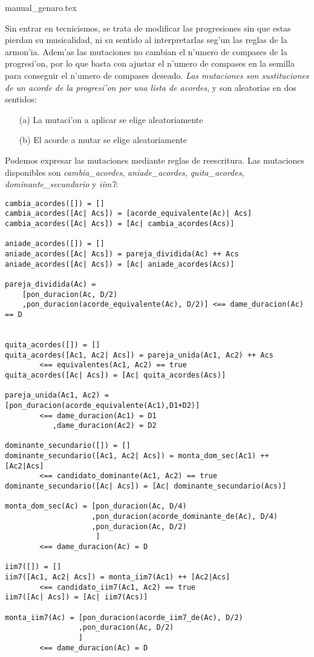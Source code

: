 ﻿manual_genaro.tex\documentclass[a4paper,12pt]{article}
\begin{document}
\begin{enumerate}
        Sin entrar en tecnicismos, se trata de modificar las progresiones sin que estas pierdan su musicalidad, ni su sentido al interpretarlas seg'un las reglas de la armon'ia. Adem'as las mutaciones no cambian el n'umero de compases de la progresi'on, por lo que basta con ajustar el n'umero de compases en la semilla para conseguir el n'umero de compases deseado.
\newline
\newline
        \emph{Las mutaciones son sustituciones de un acorde de la progresi'on por una lista de acordes}, y son aleatorias en dos sentidos:
                \begin{enumerate}
                \item[(a)] La mutaci'on a aplicar se elige aleatoriamente
                \item[(b)] El acorde a mutar se elige aleatoriamente
                \end{enumerate}

        Podemos expresar las mutaciones mediante reglas de reescritura. Las mutaciones disponibles son \emph{cambia\_acordes}, \emph{aniade\_acordes}, \emph{quita\_acordes}, \emph{dominante\_secundario} y \emph{iim7}:

        \begin{verbatim}
cambia_acordes([]) = []
cambia_acordes([Ac| Acs]) = [acorde_equivalente(Ac)| Acs]
cambia_acordes([Ac| Acs]) = [Ac| cambia_acordes(Acs)]

aniade_acordes([]) = []
aniade_acordes([Ac| Acs]) = pareja_dividida(Ac) ++ Acs
aniade_acordes([Ac| Acs]) = [Ac| aniade_acordes(Acs)]

pareja_dividida(Ac) =  
    [pon_duracion(Ac, D/2)
    ,pon_duracion(acorde_equivalente(Ac), D/2)] <== dame_duracion(Ac) == D


quita_acordes([]) = []
quita_acordes([Ac1, Ac2| Acs]) = pareja_unida(Ac1, Ac2) ++ Acs
        <== equivalentes(Ac1, Ac2) == true
quita_acordes([Ac| Acs]) = [Ac| quita_acordes(Acs)]

pareja_unida(Ac1, Ac2) =  [pon_duracion(acorde_equivalente(Ac1),D1+D2)] 
        <== dame_duracion(Ac1) = D1
           ,dame_duracion(Ac2) = D2

dominante_secundario([]) = []
dominante_secundario([Ac1, Ac2| Acs]) = monta_dom_sec(Ac1) ++ [Ac2|Acs]
        <== candidato_dominante(Ac1, Ac2) == true
dominante_secundario([Ac| Acs]) = [Ac| dominante_secundario(Acs)]

monta_dom_sec(Ac) = [pon_duracion(Ac, D/4)
                    ,pon_duracion(acorde_dominante_de(Ac), D/4)
                    ,pon_duracion(Ac, D/2)
                     ]
        <== dame_duracion(Ac) = D

iim7([]) = []
iim7([Ac1, Ac2| Acs]) = monta_iim7(Ac1) ++ [Ac2|Acs]
        <== candidato_iim7(Ac1, Ac2) == true
iim7([Ac| Acs]) = [Ac| iim7(Acs)]

monta_iim7(Ac) = [pon_duracion(acorde_iim7_de(Ac), D/2)
                 ,pon_duracion(Ac, D/2)
                 ]
        <== dame_duracion(Ac) = D
        \end{verbatim}
        
\end{enumerate}
\end{document}
